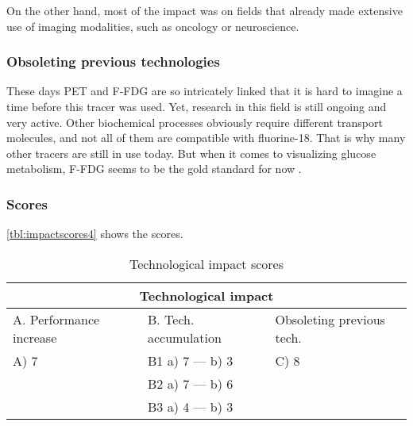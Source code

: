 On the other hand, most of the impact was on fields that already made extensive
use of imaging modalities, such as oncology or neuroscience.

\subsubsection{Obsoleting previous technologies}
These days PET and F-FDG are so intricately linked that it is hard to imagine a
time before this tracer was used. Yet, research in this field is still ongoing
and very active. Other biochemical processes obviously require different
transport molecules, and not all of them are compatible with fluorine-18. That
is why many other tracers are still in use today. But when it comes to
visualizing glucose metabolism, F-FDG seems to be the gold standard for now
\cite{radiopharma}.

\subsubsection{Scores}
\autoref{tbl:impactscores4} shows the scores.

\begin{table}[h]
\centering
\begin{tabular}{l l l}
\hline
\multicolumn{3}{|c|}{Technological impact} \\
\hline
A. Performance increase & B. Tech. accumulation & Obsoleting previous tech.\\
A) 7 & B1 a) 7 --- b) 3 & C) 8\\ 
     & B2 a) 7 --- b) 6 & \\
     & B3 a) 4 --- b) 3 & \\
\hline
\end{tabular}
\caption{Technological impact scores}
\label{tbl:impactscores4}
\end{table}